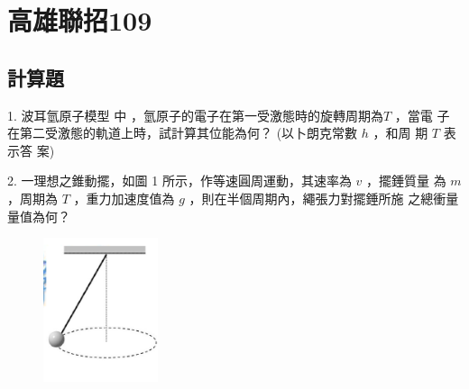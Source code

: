 \documentclass[cn,10pt,math=newtx,chinesefont=founder,device=ig]{elegantbook}
\begin{document}
\newpage




\chapter{高雄聯招109}
\section{計算題}

\begin{example}
   1. 波耳氫原子模型 中 ，氫原子的電子在第一受激態時的旋轉周期為$T$ ，當電
子 在第二受激態的軌道上時，試計算其位能為何？ (以卜朗克常數 $h$ ，和周
期 $T$ 表 示答 案)\\
    \rightline{[高雄聯招教甄109]}
\end{example}
\begin{solution}
    
\end{solution}

\newpage

\begin{example}
   2. 一理想之錐動擺，如圖 1 所示，作等速圓周運動，其速率為 $v$ ，擺錘質量
為 $m$ ，周期為 $T$ ，重力加速度值為 $g$ ，則在半個周期內，繩張力對擺錘所施
之總衝量量值為何？\\
    \rightline{[高雄聯招教甄109]}
\end{example}
\begin{solution}
    
\end{solution}
\begin{figure}[htbp]
    \flushright
    \includegraphics[width=0.3\textwidth]{image/109高雄2.png}
  \end{figure}
\newpage
\end{document}
